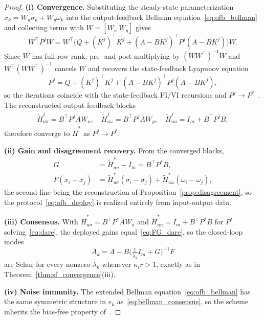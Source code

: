 \documentclass[12pt]{elsarticle}
\theoremstyle{remark}
\begin{document}
\begin{proof}
\textbf{(i) Convergence.} Substituting the steady-state parameterization $x_k = W_u\sigma_k + W_y\omega_k$ into the output-feedback Bellman equation~\eqref{eq:ofb_bellman} and collecting terms with $W=[W_u\ W_y]$ gives
\begin{equation*}
W^\top P^j W = W^\top\!\big(Q + (K^j)^\top K^j + (A - BK^j)^\top P^j (A - BK^j)\big) W.
\end{equation*}
Since $W$ has full row rank, pre- and post-multiplying by $(WW^\top)^{-1}W$ and $W^\top(WW^\top)^{-1}$ cancels $W$ and recovers the state-feedback Lyapunov equation
\begin{equation*}
P^j = Q + (K^j)^\top K^j + (A - BK^j)^\top P^j (A - BK^j),
\end{equation*}
so the iterations coincide with the state-feedback PI/VI recursions and $P^j \to P^*$~\cite[Thms.~2.6, 2.7]{rizvi2022}. The reconstructed output-feedback blocks
\begin{align*}
\tilde{H}_{u\sigma}^j = B^\top P^j A W_u, \quad
\tilde{H}_{u\omega}^j = B^\top P^j A W_y, \quad
\tilde{H}_{uu}^j = I_m + B^\top P^j B,
\end{align*}
therefore converge to $\tilde{H}^*$ as $P^j \to P^*$.

\textbf{(ii) Gain and disagreement recovery.} From the converged blocks,
\begin{align*}
G &= \tilde{H}_{uu}^* - I_m = B^\top P^* B,\\
F(x_i - x_j) &= \tilde{H}_{u\sigma}^*(\sigma_i - \sigma_j) + \tilde{H}_{u\omega}^*(\omega_i - \omega_j),
\end{align*}
the second line being the reconstruction of Proposition~\ref{prop:disagreement}, so the protocol~\eqref{eq:ofb_deploy} is realized entirely from input-output data.

\textbf{(iii) Consensus.} With $\tilde{H}_{u\sigma}^* = B^\top P^* A W_u$ and $\tilde{H}_{uu}^* = I_m + B^\top P^* B$ for $P^*$ solving~\eqref{eq:dare}, the deployed gains equal~\eqref{eq:FG_dare}, so the closed-loop modes
\begin{equation*}
\bar{A}_k = A - B\big(\tfrac{1}{\bar{\lambda}_k} I_m + G\big)^{-1} F
\end{equation*}
are Schur for every nonzero $\bar{\lambda}_k$ whenever $\kappa_i \bar{r} > 1$, exactly as in Theorem~\ref{thm:sf_convergence}(iii).

\textbf{(iv) Noise immunity.} The extended Bellman equation~\eqref{eq:ofb_bellman} has the same symmetric structure in $e_k$ as~\eqref{eq:bellman_consensus}, so the scheme inherits the bias-free property of~\cite[Thm.~2.8]{rizvi2022}.
\end{proof}
\end{document}
